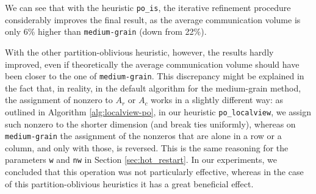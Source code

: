 We can see that with the heuristic \verb|po_is|, the iterative refinement procedure considerably improves the final result, as the average communication volume is only 6\% higher than \verb|medium-grain| (down from 22\%).

With the other partition-oblivious heuristic, however, the results hardly improved, even if theoretically the average communication volume should have been closer to the one of \verb|medium-grain|. This discrepancy might be explained in the fact that, in reality, in the default algorithm for the medium-grain method, the assignment of nonzero to $A_r$ or $A_c$ works in a slightly different way: as outlined in Algorithm \ref{alg:localview-po}, in our heuristic \verb|po_localview|, we assign such nonzero to the shorter dimension (and break ties uniformly), whereas on \verb|medium-grain| the assignment of the nonzeros that are alone in a row or a column, and only with those, is reversed. This is the same reasoning for the parameters \verb|w| and \verb|nw| in Section \ref{sec:hot_restart}. In our experiments, we concluded that this operation was not particularly effective, whereas in the case of this partition-oblivious heuristics it has a great beneficial effect.


